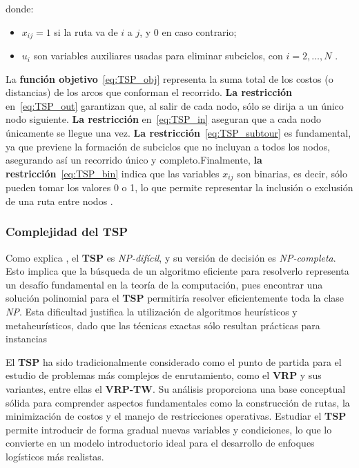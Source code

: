 \documentclass[12pt,titlepage,twoside,openright]{book}
\begin{document}
\medskip

\noindent donde:
\begin{itemize}
	\item \(x_{ij} = 1\) si la ruta va de \(i\) a \(j\), y 0 en caso contrario;
	\item \(u_i\) son variables auxiliares usadas para eliminar subciclos, con \(i=2,\dots,N\) \citep{torres2018}.
\end{itemize}

La \textbf{función objetivo}~\eqref{eq:TSP_obj} representa la suma total de los costos (o distancias) de los arcos que conforman el recorrido. \textbf{La restricción} en~\eqref{eq:TSP_out} garantizan que, al salir de cada nodo, sólo se dirija a un único nodo siguiente. \textbf{La restricción} en~\eqref{eq:TSP_in} aseguran que a cada nodo únicamente se llegue una vez. \textbf{La restricción}~\eqref{eq:TSP_subtour} es fundamental, ya que previene la formación de subciclos que no incluyan a todos los nodos, asegurando así un recorrido único y completo.Finalmente, \textbf{la restricción}~\eqref{eq:TSP_bin} indica que las variables \(x_{ij}\) son binarias, es decir, sólo pueden tomar los valores 0 o 1, lo que permite representar la inclusión o exclusión de una ruta entre nodos \citep{torres2018}.

\subsubsection*{Complejidad del TSP}

Como explica \cite{papadimitriou1998}, el \textbf{TSP} es \textit{NP-difícil}, y su versión de decisión es \textit{NP-completa}. Esto implica que la búsqueda de un algoritmo eficiente para resolverlo representa un desafío fundamental en la teoría de la computación, pues encontrar una solución polinomial para el \textbf{TSP} permitiría resolver eficientemente toda la clase \textit{NP}. Esta dificultad justifica la utilización de algoritmos heurísticos y metaheurísticos, dado que las técnicas exactas sólo resultan prácticas para instancias

El \textbf{TSP} ha sido tradicionalmente considerado como el punto de partida para el estudio de problemas más complejos de enrutamiento, como el \textbf{VRP} y sus variantes, entre ellas el  \textbf{VRP-TW}. Su análisis proporciona una base conceptual sólida para comprender aspectos fundamentales como la construcción de rutas, la minimización de costos y el manejo de restricciones operativas. Estudiar el \textbf{TSP} permite introducir de forma gradual nuevas variables y condiciones, lo que lo convierte en un modelo introductorio ideal para el desarrollo de enfoques logísticos más realistas.
\end{document}

